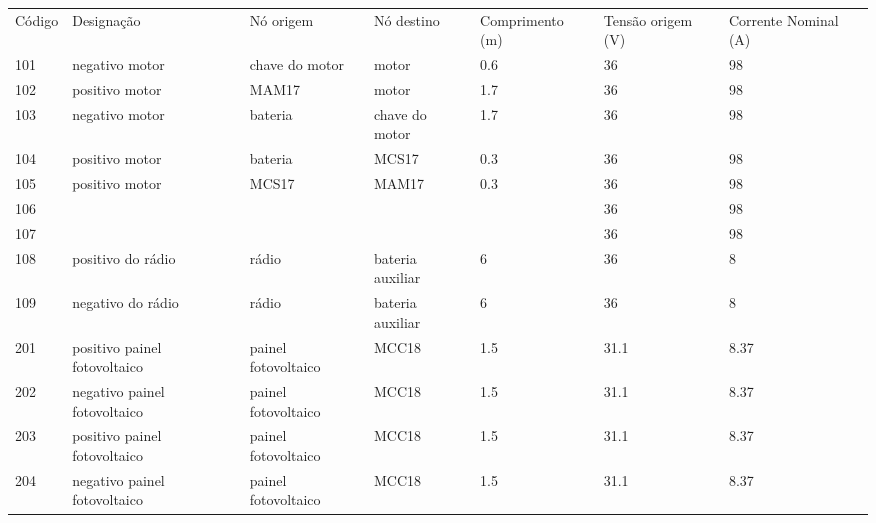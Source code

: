 \documentclass{article}
\begin{document}
\begin{landscape}
\begin{table}[]
\begin{tabular}{lllllll}
Código & Designação                   & Nó origem           & Nó destino       & Comprimento (m) & Tensão origem (V) & Corrente Nominal (A) \\
101    & negativo motor               & chave do motor      & motor            & 0.6             & 36                & 98                   \\
102    & positivo motor               & MAM17               & motor            & 1.7             & 36                & 98                   \\
103    & negativo motor               & bateria             & chave do motor   & 1.7             & 36                & 98                   \\
104    & positivo motor               & bateria             & MCS17            & 0.3             & 36                & 98                   \\
105    & positivo motor               & MCS17               & MAM17            & 0.3             & 36                & 98                   \\
106    &                              &                     &                  &                 & 36                & 98                   \\
107    &                              &                     &                  &                 & 36                & 98                   \\
108    & positivo do rádio            & rádio               & bateria auxiliar & 6               & 36                & 8                    \\
109    & negativo do rádio            & rádio               & bateria auxiliar & 6               & 36                & 8                    \\
201    & positivo painel fotovoltaico & painel fotovoltaico & MCC18            & 1.5             & 31.1              & 8.37                 \\
202    & negativo painel fotovoltaico & painel fotovoltaico & MCC18            & 1.5             & 31.1              & 8.37                 \\
203    & positivo painel fotovoltaico & painel fotovoltaico & MCC18            & 1.5             & 31.1              & 8.37                 \\
204    & negativo painel fotovoltaico & painel fotovoltaico & MCC18            & 1.5             & 31.1              & 8.37                 \\

\end{tabular}
\end{table}
\end{landscape}
\end{document}
